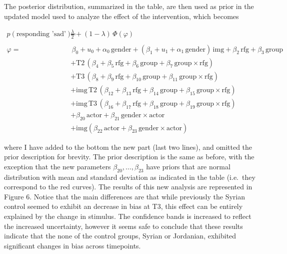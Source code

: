 \documentclass[]{article}
\begin{document}
The posterior distribution, summarized in the table, are then used as
prior in the updated model used to analyze the effect of the
intervention, which becomes

\begin{align*}
 p(\text{responding 'sad'}) = & \frac{\lambda}{2} + (1 - \lambda) \, \Phi \left(\varphi \right)  \\
 \, \\
\varphi =  & \,  \beta_0  + u_0 + \alpha_0 \, \text{gender} + \left(\beta_1 +  u_1 + \alpha_1 \, \text{gender}\right)\, \text{img} +\beta_2\, \text{rfg} + \beta_3 \, \text{group} \\
& + \text{T2} \, \left(\beta_4 +\beta_5 \, \text{rfg} + \beta_6 \, \text{group} + \beta_7 \, \text{group} \times \text{rfg} \right) \\
& + \text{T3} \, \left(\beta_8 +\beta_9 \, \text{rfg} + \beta_{10} \, \text{group} + \beta_{11} \, \text{group} \times \text{rfg} \right)\\
& + \text{img} \, \text{T2} \, \left(\beta_{12} +\beta_{13} \, \text{rfg} + \beta_{14} \, \text{group} + \beta_{15} \, \text{group} \times \text{rfg} \right) \\
& + \text{img} \, \text{T3} \, \left(\beta_{16} +\beta_{17} \, \text{rfg} + \beta_{18} \, \text{group} + \beta_{19} \, \text{group} \times \text{rfg} \right)\\
& + \beta_{20} \, \text{actor} + \beta_{21} \, \text{gender} \times \text{actor}\\
& + \text{img} \left( \beta_{22} \, \text{actor} + \beta_{23} \, \text{gender} \times \text{actor} \right)
\end{align*}

where I have added to the bottom the new part (last two lines), and
omitted the prior description for brevity. The prior description is the
same as before, with the exception that the new parameters
\(\beta_{20}, \dots, \beta_{23}\) have priors that are normal
distribution with mean and standard deviation as indicated in the table
(i.e.~they correspond to the red curves). The results of this new
analysis are represented in Figure 6. Notice that the main differences
are that while previously the Syrian control seemed to exhibit an
decrease in bias at T3, this effect can be entirely explained by the
change in stimulus. The confidence bands is increased to reflect the
increased uncertainty, however it seems safe to conclude that these
results indicate that the none of the control groups, Syrian or
Jordanian, exhibited significant changes in bias across timepoints.
\end{document}
